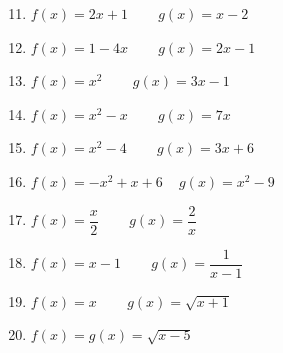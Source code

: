 \documentclass[12pt]{article}
\theoremstyle{definition}
\begin{document}
\begin{multicols}{2}
\begin{enumerate}
\setcounter{enumi}{10}
\item $f(x) = 2x+1$ ~~~ $g(x) = x-2$
\item $f(x) = 1-4x$ ~~~ $g(x) = 2x-1$
\item $f(x) = x^2$ ~~~ $g(x) = 3x-1$
\item $f(x) = x^2-x$ ~~~ $g(x) = 7x$
\item $f(x) = x^2-4$ ~~~ $g(x) = 3x+6$
\item $f(x) = -x^2+x+6$ ~ $g(x) = x^2-9$
\item $f(x) = \dfrac{x}{2}$ ~~~ $g(x) = \dfrac{2}{x}$
\item $f(x) =x-1$ ~~~ $g(x) = \dfrac{1}{x-1}$
\item $f(x) = x$ ~~~ $g(x) = \sqrt{x+1}$
\item $f(x) = g(x) = \sqrt{x-5}$
\end{enumerate}
\end{multicols}
\newpage
\ \newpage
\end{document}
